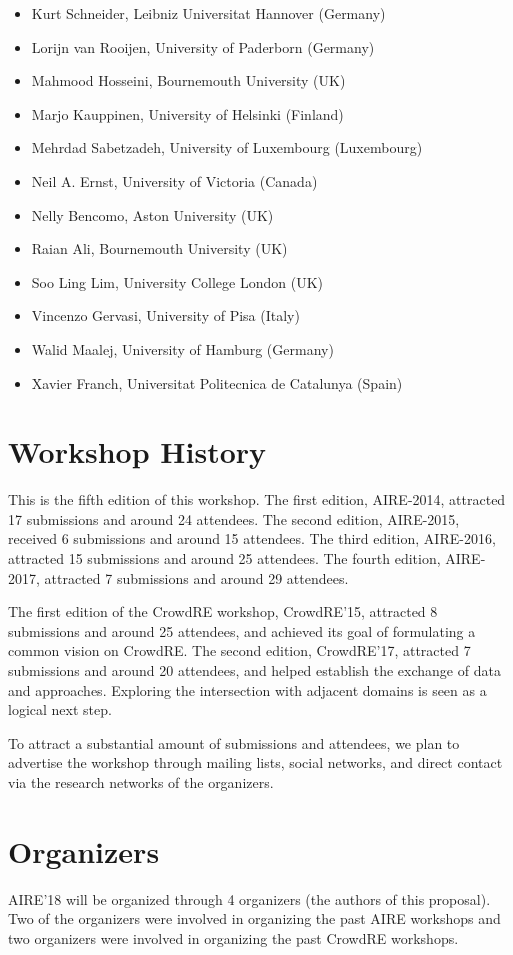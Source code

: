 \documentclass[conference,9pt]{IEEEtran}
\begin{document}
\begin{itemize}
  \item Kurt Schneider, Leibniz Universitat Hannover (Germany)
  \item Lorijn van Rooijen, University of Paderborn (Germany)
  \item Mahmood Hosseini, Bournemouth University (UK)
  \item Marjo Kauppinen, University of Helsinki (Finland)
  \item Mehrdad Sabetzadeh, University of Luxembourg (Luxembourg)
  \item Neil A. Ernst, University of Victoria (Canada)
  \item Nelly Bencomo, Aston University (UK)
  \item Raian Ali, Bournemouth University (UK)
  \item Soo Ling Lim, University College London (UK)
  \item Vincenzo Gervasi, University of Pisa (Italy)
  \item Walid Maalej, University of Hamburg (Germany)
  \item Xavier Franch, Universitat Politecnica de Catalunya (Spain)
\end{itemize}


\section{Workshop History}
This is the fifth edition of this workshop. The first edition, AIRE-2014, attracted 17 submissions and around 24 attendees. The second edition, AIRE-2015, received 6 submissions and around 15 attendees. 
The third edition, AIRE-2016, attracted 15 submissions and around 25 attendees. The fourth edition, AIRE-2017, attracted 7 submissions and around 29 attendees.

The first edition of the CrowdRE workshop, CrowdRE'15, attracted 8 submissions and around 25 attendees, and achieved its goal of formulating a common vision on CrowdRE. The second edition, CrowdRE'17, attracted 7 submissions and around 20 attendees, and helped establish the exchange of data and approaches. Exploring the intersection with adjacent domains is seen as a logical next step.

To attract a substantial amount of submissions and attendees, we plan to advertise the workshop through mailing lists, social networks, and direct contact via the research networks of the organizers.

\section{Organizers}
AIRE'18 will be organized through 4 organizers (the authors of this proposal). Two of the organizers were involved in organizing the past AIRE workshops and two organizers were involved in organizing the past CrowdRE workshops. 
\end{document}
